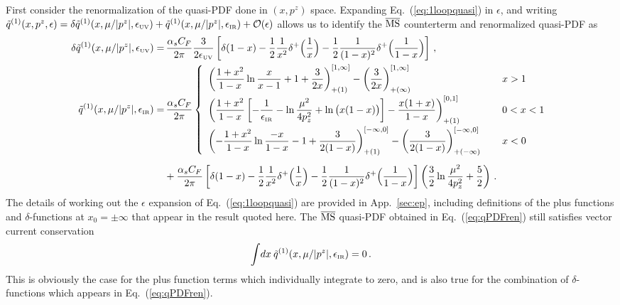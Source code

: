 \documentclass[prd,aps,twocolumn,preprintnumbers,showpacs,nofootinbib,superscriptaddress,notitlepage]{revtex4-1}
\newcommand{\nn}{\nonumber}
\DeclareRobustCommand{\app}[1]{App.~\ref{sec:#1}}
\DeclareRobustCommand{\eq}[1]{Eq.~(\ref{eq:#1})}
\DeclareRobustCommand{\app}[1]{App.~\ref{sec:#1}}
\begin{document}
\begin{widetext}
First consider the renormalization of the quasi-PDF done in $(x,p^z)$ space. Expanding Eq.~(\ref{eq:1loopquasi}) in $\epsilon$, and writing $\tilde{q}^{(1)}(x,p^z,\epsilon) =\delta \tilde{q}^{(1)}(x,\mu/|p^z|,\epsilon_{\mbox{\tiny UV}})+\tilde{q}^{(1)}(x,\mu/|p^z|,\epsilon_{\mbox{\tiny IR}}) +{\cal O}(\epsilon)$ allows us to identify the $\overline{\rm MS}$ counterterm and renormalized quasi-PDF as
\begin{align}\label{eq:qPDFren}
\delta \tilde{q}^{(1)}(x,\mu/|p^z|,\epsilon_{\mbox{\tiny UV}})
=&\,  {\alpha_sC_F\over 2\pi} {3\over 2\epsilon_{\mbox{\tiny UV}}}
 \left[\delta(1-x) - {1\over2}{1\over x^2}\delta^+\Big({1\over x}\Big) - {1\over2}{1\over (1-x)^2}\delta^+\Big({1\over 1-x}\Big) \right]
 \,, \nn\\
\tilde{q}^{(1)}(x,\mu/|p^z|,\epsilon_{\mbox{\tiny IR}})
=&\, {\alpha_sC_F\over 2\pi}\left\{
\begin{array}{ll}
\displaystyle \left({1+x^2\over 1-x}\ln {x\over x-1} + 1 + {3\over 2x}\right)^{[1,\infty]}_{+(1)}- \left({3\over 2x}\right)^{[1,\infty]}_{+(\infty)} &\, x>1\nn\\[10pt]
\displaystyle \left({1+x^2\over 1-x}\left[- {1\over \epsilon_{\mbox{\tiny IR}}} - \ln{\mu^2\over 4p_z^2} + \ln\big(x(1-x)\big)\right] - {x(1+x)\over 1-x}\right)^{[0,1]}_{+(1)}  &\, 0<x<1\nn\\[10pt]
\displaystyle  \left(-{1+x^2\over 1-x}\ln {-x\over 1-x} - 1 + {3\over 2(1-x)}\right)^{[-\infty,0]}_{+(1)} - \left({3\over 2(1-x)}\right)^{[-\infty,0]}_{+(-\infty)} \quad &\, x<0
\end{array}\right.\nn\\[5pt]
& + {\alpha_sC_F\over 2\pi}\left[\delta(1-x) - {1\over2}{1\over x^2}\delta^+\Big({1\over x}\Big) - {1\over2}{1\over (1-x)^2}\delta^+\Big({1\over 1-x}\Big) \right] \left( {3\over2}\ln{\mu^2\over 4p_z^2} + {5\over2}\right)
 \,.
\end{align}
The details of working out the $\epsilon$ expansion of \eq{1loopquasi} are provided in \app{ep}, including definitions of the plus functions and $\delta$-functions at $x_0=\pm \infty$ that appear in the result quoted here. The $\overline{\rm MS}$ quasi-PDF obtained in \eq{qPDFren} still satisfies vector current conservation
\begin{align} \label{eq:qpdfconsrv}
 \int\! dx\: \tilde{q}^{(1)}(x,\mu/|p^z|,\epsilon_{\mbox{\tiny IR}})  =0 \,.
\end{align}
This is obviously the case for the plus function terms which individually integrate to zero, and is also true for the combination of $\delta$-functions which appears in \eq{qPDFren}.


\end{widetext}
\end{document}
